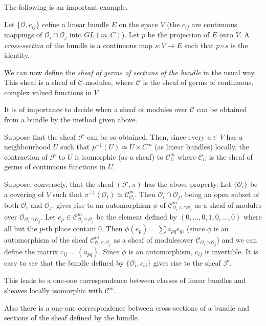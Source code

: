 The following is an important example.

Let $\{\mathscr{O}, c_{ij}\}$ cefine a linear bundle $E$ on the space
$V$ (the $c_{ij}$ are continuous mappings of $\mathscr{O}_i \cap
\mathscr{O}_j$ into $GL(m,C)$). Let $p$ be the projection of $E$ onto
$V$. A \textit{cross-section} of the bundle is a continuous map $s : V
\to E$ such that $p \circ s$ is the identity.

We can now define the \textit{sheaf of germs of sections of the
  bundle} in the usual way. This sheaf is a sheaf of
$\mathscr{C}$-modules, where $\mathscr{C}$ is the sheaf of germs of
continuous, complex valued functions in $V$. 

It is of importance to decide when a sheaf of modules over
$\mathscr{C}$ can be obtained from a bundle by the method given
above. 

Suppose that the sheaf $\mathscr{F}$ can be so obtained. Then, since
every $a \in V$ has a neighbourhood $U$ such that $p^{-1}(U) \simeq U
\times C^m$ (as linear bundles) locally, the contraction of
$\mathscr{F}$ to $U$ is isomorphic (as a sheaf) to $\mathscr{C}^m_U$
where $\mathscr{C}_U$ is the sheaf of germs of continuous functions
in $U$. 

Suppose, conversely, that the sheaf $(\mathscr{F}, \pi)$ has the above
property. Let $\{\mathscr{O}_i\}$ be a covering of $V$ such that
$\pi^{-1} (\mathscr{O}_i) \simeq \mathscr{C}^m_{\mathscr{O}_i}$. Then
$\mathscr{O}_i \cap \mathscr{O}_j$, being an open subset of both
$\mathscr{O}_i$ and $\mathscr{O}_j$, gives rise to an automorphism
$\phi$ of $\mathscr{C}^m_{\mathscr{O}_i \wedge \cap \mathscr{O}_j}$ as
a sheaf of modules over $\mathscr{O}_{\mathscr{O}_i \cap
  \mathscr{O}_j}$. Let $e_p \in \mathscr{C}^m_{\mathscr{O}_i \cap
  \mathscr{O}_j }$ be the element defined by $(0, \ldots, 0, 1, 0,
\ldots, 0)$ where all but the $p$-th place contain 0. Then $\phi(e_p)
= \sum a_{pq} e_{q}$, (since $\phi$ is an automorphism of the sheaf
$\mathscr{C}^m_{\mathscr{O}_i \cap \mathscr{O}_j}$ as a sheaf of
modules\pageoriginale over $\mathscr{C}_{\mathscr{O}_i \cap
  \mathscr{O}_j}$) and we can define the matrix $c_{ij} =
(a_{pq})$. Since $\phi$ is an automorphism, $c_{ij}$ is invertible. It
is easy to see that the bundle defined by $\{\mathscr{O}_i, c_{ij}\}$
gives rise to the sheaf $\mathscr{F}$. 

This leads to a one-one correspondence between classes of linear
bundles and sheaves locally isomorphic with $\mathscr{C}^m$. 

Also there is a one-one correspondence between cross-sections of a
bundle and sections of the sheaf defined by the bundle. 
